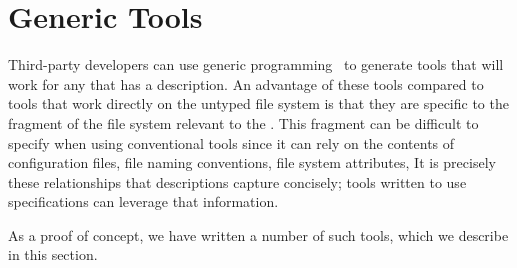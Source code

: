 \section{Generic Tools}
\label{sec:tools}
Third-party developers can use generic programming~\cite{Lammel+:syb} to
generate tools that will work for any \filestore{} that has a
\forest{} description.  An advantage of these tools compared to tools
that work directly on the untyped file system is that they are
specific to the fragment of the file system relevant to the
\filestore{}.  This fragment can be difficult to specify when using
conventional tools since it can rely on the contents of configuration
files, file naming conventions, file system attributes, \etc\/
It is precisely these relationships that \forest{} descriptions
capture concisely; tools written to use \forest{} specifications 
can leverage that information.

As a proof of concept, we have written a
number of such tools, which we describe in this section.  

